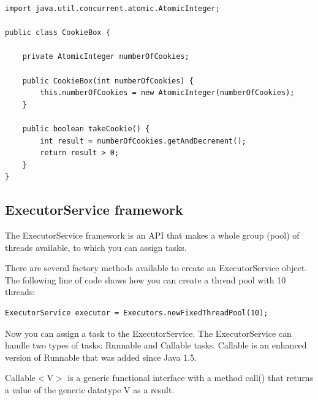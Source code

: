 \begin{lstlisting}
import java.util.concurrent.atomic.AtomicInteger;

public class CookieBox {

	private AtomicInteger numberOfCookies;

	public CookieBox(int numberOfCookies) {
		this.numberOfCookies = new AtomicInteger(numberOfCookies);
	}

	public boolean takeCookie() {
		int result = numberOfCookies.getAndDecrement();
		return result > 0;
	}
}
\end{lstlisting}


\subsection{ExecutorService framework}

The ExecutorService framework is an API that makes a whole group (pool) of threads available, to which you can assign tasks.

There are several factory methods available to create an ExecutorService object. The following line of code shows how you can create a thread pool with 10 threads:

\begin{lstlisting}
ExecutorService executor = Executors.newFixedThreadPool(10);
\end{lstlisting}

Now you can assign a task to the ExecutorService. The ExecutorService can handle two types of tasks: Runnable and Callable tasks. Callable is an enhanced version of Runnable that was added since Java 1.5.

Callable$<$V$>$ is a generic functional interface with a method call() that returns a value of the generic datatype V as a result.


